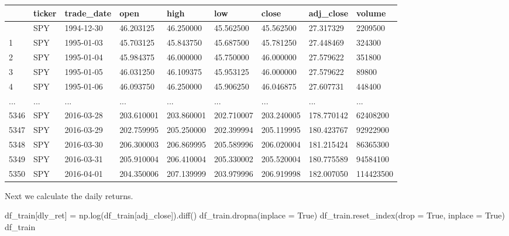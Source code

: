 \documentclass[
  letterpaper,
  DIV=11,
  numbers=noendperiod]{scrreprt}
\newenvironment{Shaded}{\begin{snugshade}}{\end{snugshade}}
\newcommand{\NormalTok}[1]{\textcolor[rgb]{0.00,0.23,0.31}{#1}}
\newcommand{\OperatorTok}[1]{\textcolor[rgb]{0.37,0.37,0.37}{#1}}
\newcommand{\StringTok}[1]{\textcolor[rgb]{0.13,0.47,0.30}{#1}}
\newcommand{\VariableTok}[1]{\textcolor[rgb]{0.07,0.07,0.07}{#1}}
\begin{document}
\begin{longtable}[]{@{}lllllllll@{}}
\toprule\noalign{}
& ticker & trade\_date & open & high & low & close & adj\_close &
volume \\
\midrule\noalign{}
\endhead
\bottomrule\noalign{}
\endlastfoot
0 & SPY & 1994-12-30 & 46.203125 & 46.250000 & 45.562500 & 45.562500 &
27.317329 & 2209500 \\
1 & SPY & 1995-01-03 & 45.703125 & 45.843750 & 45.687500 & 45.781250 &
27.448469 & 324300 \\
2 & SPY & 1995-01-04 & 45.984375 & 46.000000 & 45.750000 & 46.000000 &
27.579622 & 351800 \\
3 & SPY & 1995-01-05 & 46.031250 & 46.109375 & 45.953125 & 46.000000 &
27.579622 & 89800 \\
4 & SPY & 1995-01-06 & 46.093750 & 46.250000 & 45.906250 & 46.046875 &
27.607731 & 448400 \\
... & ... & ... & ... & ... & ... & ... & ... & ... \\
5346 & SPY & 2016-03-28 & 203.610001 & 203.860001 & 202.710007 &
203.240005 & 178.770142 & 62408200 \\
5347 & SPY & 2016-03-29 & 202.759995 & 205.250000 & 202.399994 &
205.119995 & 180.423767 & 92922900 \\
5348 & SPY & 2016-03-30 & 206.300003 & 206.869995 & 205.589996 &
206.020004 & 181.215424 & 86365300 \\
5349 & SPY & 2016-03-31 & 205.910004 & 206.410004 & 205.330002 &
205.520004 & 180.775589 & 94584100 \\
5350 & SPY & 2016-04-01 & 204.350006 & 207.139999 & 203.979996 &
206.919998 & 182.007050 & 114423500 \\
\end{longtable}

Next we calculate the daily returns.

\begin{Shaded}
\begin{Highlighting}[]
\NormalTok{df\_train[}\StringTok{\textquotesingle{}dly\_ret\textquotesingle{}}\NormalTok{] }\OperatorTok{=}\NormalTok{ np.log(df\_train[}\StringTok{\textquotesingle{}adj\_close\textquotesingle{}}\NormalTok{]).diff()}
\NormalTok{df\_train.dropna(inplace }\OperatorTok{=} \VariableTok{True}\NormalTok{)}
\NormalTok{df\_train.reset\_index(drop }\OperatorTok{=} \VariableTok{True}\NormalTok{, inplace }\OperatorTok{=} \VariableTok{True}\NormalTok{)}
\NormalTok{df\_train}
\end{Highlighting}
\end{Shaded}
\end{document}
